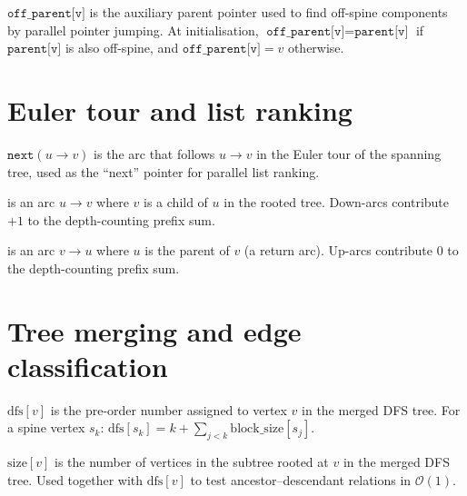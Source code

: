 \begin{ppdefn}
 $\texttt{off\_parent[v]}$ is the auxiliary
parent pointer used to find off-spine components by parallel pointer
jumping.  At initialisation,
$\texttt{off\_parent[v]} = \texttt{parent[v]}$ if
$\texttt{parent[v]}$ is also off-spine, and
$\texttt{off\_parent[v]} = v$ otherwise.
\end{ppdefn}

\section*{Euler tour and list ranking}

\begin{ppdefn}
 $\texttt{next}(u \to v)$ is the arc that follows
$u \to v$ in the Euler tour of the spanning tree, used as the
``next'' pointer for parallel list ranking.
\end{ppdefn}

\begin{ppdefn}
 is an arc $u \to v$ where $v$ is a child of $u$ in
the rooted tree.  Down-arcs contribute $+1$ to the depth-counting
prefix sum.
\end{ppdefn}

\begin{ppdefn}
 is an arc $v \to u$ where $u$ is the parent of $v$
(a return arc).  Up-arcs contribute $0$ to the depth-counting prefix
sum.
\end{ppdefn}

\section*{Tree merging and edge classification}

\begin{ppdefn}
 $\mathrm{dfs}[v]$ is the pre-order number
assigned to vertex $v$ in the merged DFS tree.  For a spine vertex
$s_k$:
$\mathrm{dfs}[s_k] = k + \sum_{j < k} \mathrm{block\_size}[s_j]$.
\end{ppdefn}

\begin{ppdefn}
 $\mathrm{size}[v]$ is the number of vertices in
the subtree rooted at $v$ in the merged DFS tree.  Used together with
$\mathrm{dfs}[v]$ to test ancestor--descendant relations in
$\mathcal{O}(1)$.
\end{ppdefn}

